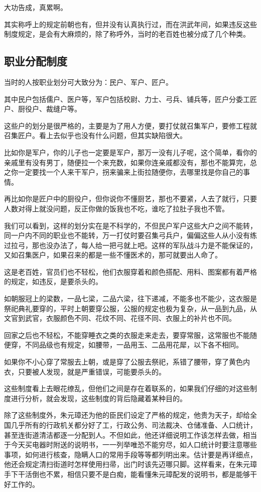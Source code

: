\begin{multicols}{\theparacolNo}
		大功告成，真累啊。

		其实称呼上的规定前朝也有，但并没有认真执行过，而在洪武年间，如果违反这些制度规定，是会有大麻烦的，除了称呼外，当时的老百姓也被分成了几个种类。

		\subsection{职业分配制度}
		当时的人按职业划分可大致分为：民户、军户、匠户。

		其中民户包括儒户、医户等，军户包括校尉、力士、弓兵、铺兵等，匠户分委工匠户、厨役户、裁缝户等。

		这些户的划分是很严格的，主要是为了用人方便，要打仗就召集军户，要修工程就召集匠户。看上去似乎也没有什么问题，但其实缺陷很大。

		比如你是军户，你的儿子也一定要是军户，那万一没有儿子呢，这个简单，看你的亲戚里有没有男丁，随便拉一个来充数，如果你连亲戚都没有，那也不能算完，总之你一定要找一个人来干军户，拐来骗来上街拉随便你，去哪里找是你自己的事情。

		再比如你是匠户中的厨役户，但你说你不懂厨艺，那也不要紧，人去了就行，只要人数对得上就没问题，反正你做的饭我也不吃，谁吃了拉肚子我也不管。

		我们可以看到，这样的划分实在是不科学的，不但民户军户这些大户之间不能转，同一户内不同的职业也不能转，万一打仗时要召集弓兵户，偏偏这些人从小没有练过拉弓，那也没办法了，每人给一把弓就上吧。这样的军队战斗力是不能保证的，又如召集医户，如果召来的都是一些不懂医术的，那可就要出人命了。

		这是老百姓，官员们也不轻松，他们衣服穿着和颜色搭配、用料、图案都有着严格的规定，如违反，是要杀头的。

		如朝服冠上的梁数，一品七梁，二品六梁，往下递减，不能多也不能少，这衣服是祭祀典礼要穿的，平时上朝要穿公服，公服的规定也极为复杂，从一品到九品，从文官到武官，衣服颜色不同、花纹不同、花径不同、衣服上的补片也不同。

		回家之后也不轻松，不能穿睡衣之类的衣服走来走去，要穿常服，这常服也不能随便穿，不同品级也有规定，如腰带，一品用玉、二品用花犀，以下各不相同。

		如果你不小心穿了常服去上朝，或是穿了公服去祭祀，系错了腰带，穿了黄色内衣，只要被人发现，就是严重错误，可能要杀头的。

		这些制度看上去眼花缭乱，但他们之间是存在着联系的，如果我们仔细的对这些制度进行分析，就会发现，这些制度的背后隐藏着某种目的。

		除了这些制度外，朱元璋还为他的臣民们设定了严格的规定，他贵为天子，却给全国几乎所有的行政机关都分好了工，行政公务、司法裁决、仓储准备、人口统计，甚至连街道清洁都逐一分配到人。不但如此，他还详细说明工作该怎样去做，相当于今天买电器时附送的说明书，一一列举唯恐不能穷尽，如人口统计时要注意哪些事项，如何进行核查，隐瞒人口的常用手段等等都列明出来。估计要是再详细点，他还会规定清扫街道时怎样使用扫帚，出门时该先迈哪只脚。这样看来，在朱元璋手下干活倒也不累，相信只要不是白痴，能看懂朱元璋配发的说明书，都是能够干好工作的。


\end{multicols}
